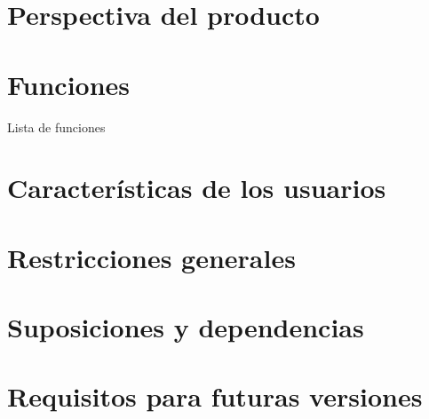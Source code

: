 
\section{Perspectiva del producto}

\section{Funciones}

Lista de funciones

\section{Características de los usuarios}

\section{Restricciones generales}

\section{Suposiciones y dependencias}


\section{Requisitos para futuras versiones}







